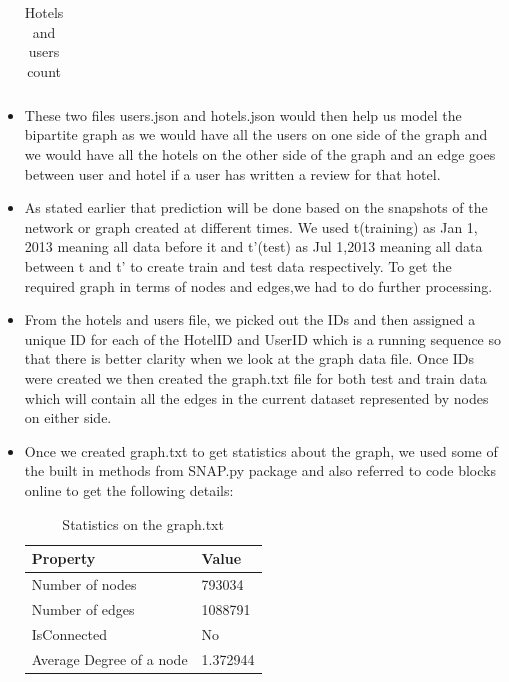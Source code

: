 \documentclass[letterpaper,twocolumn,11pt]{article}
\begin{document}
\begin{itemize}
\begin{table}[h]
\begin{tabular}{ |p{3cm}|p{3cm} |}
	\end{tabular}
	\caption{Hotels and users count} 
	\label{tab:dist1} 
\end{table} 

\item These two files users.json and hotels.json would then help us model the bipartite graph as we would have all the users on one side of the graph and we would have all the hotels on the other side of the graph and an edge goes between user and hotel if a user has written a review  for that hotel.

\item As stated earlier that prediction will be done based on the snapshots of the network or graph created at different times. We used t(training) as Jan 1, 2013 meaning all data before it and t'(test) as Jul 1,2013  meaning all data between t and t' to create train and test data respectively. To get the required graph in terms of nodes and edges,we had to do further processing.

\item From the hotels and users file, we picked out the IDs and then assigned a unique ID for each of the HotelID and UserID which is a running sequence so that there is better clarity when we look at the graph data file. Once IDs were created we then created the graph.txt file for both test and train data which will contain all the edges in the current dataset represented by nodes on either side.

\item Once we created graph.txt to get statistics about the graph, we used some of the built in methods from SNAP.py package and also referred to code blocks online to get the following details:
\begin{table}[ht]
	\begin{tabular}{ |p{5cm}|p{2cm} |}
		\hline
		\textbf {Property} & \textbf{Value}\\ \hline
		Number of nodes	&	793034 \\  \hline
		Number of edges	&	1088791 \\  \hline
		IsConnected	&	No \\  \hline
		Average Degree of a node		&	1.372944\\  \hline

		
	\end{tabular}
	\caption{Statistics on the graph.txt} 
	\label{tab:dist} 
\end{table} 

\end{itemize}
\end{document}
